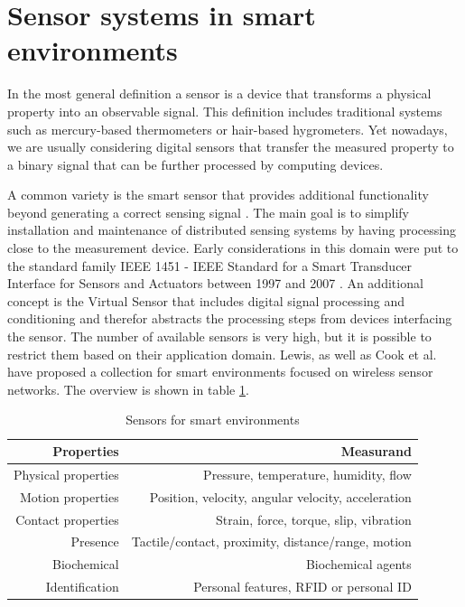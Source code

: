 \section{Sensor systems in smart environments}
\label{ch:rel_sensor_tech}
In the most general definition a sensor is a device that transforms a physical property into an observable signal. This definition includes traditional systems such as mercury-based thermometers or hair-based hygrometers. Yet nowadays, we are usually considering digital sensors that transfer the measured property to a binary signal that can be further processed by computing devices. 

A common variety is the smart sensor that provides additional functionality beyond generating a correct sensing signal \cite{frank2013understanding}. The main goal is to simplify installation and maintenance of distributed sensing systems by having processing close to the measurement device. Early considerations in this domain were put to the standard family IEEE 1451 - IEEE Standard for a Smart Transducer Interface for Sensors and Actuators between 1997 and 2007 \cite{ieee1451}. An additional concept is the Virtual Sensor that includes digital signal processing and conditioning and therefor abstracts the processing steps from devices interfacing the sensor. 
The number of available sensors is very high, but it is possible to restrict them based on their application domain. Lewis, as well as Cook et al. \cite{lewis2004wireless,cook2007smart} have proposed a collection for smart environments focused on wireless sensor networks. The overview is shown in table \ref{tab:sen_smart_env}.
\begin{table}[htbp]
  \centering
  \caption{Sensors for smart environments \cite{cook2007smart}}
    \begin{tabular}{rr}
    \toprule
    \textbf{Properties } & \textbf{Measurand} \\
    \midrule
    Physical properties  & Pressure, temperature, humidity, flow \\ \addlinespace
    Motion properties  & Position, velocity, angular velocity, acceleration \\ \addlinespace
    Contact properties  & Strain, force, torque, slip, vibration \\ \addlinespace
    Presence  & Tactile/contact, proximity, distance/range, motion \\ \addlinespace
    Biochemical  & Biochemical agents \\ \addlinespace
    Identification  & Personal features, RFID or personal ID \\
    \bottomrule
    \end{tabular}%

  \label{tab:sen_smart_env}%
\end{table}%

